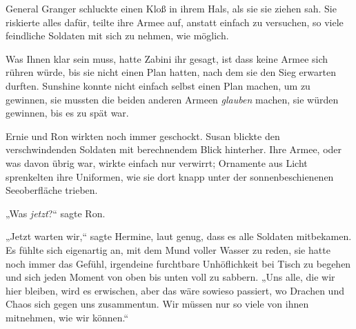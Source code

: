 General Granger schluckte einen Kloß in ihrem Hals, als sie sie ziehen sah. Sie riskierte alles dafür, teilte ihre Armee auf, anstatt einfach zu versuchen, so viele feindliche Soldaten mit sich zu nehmen, wie möglich.

Was Ihnen klar sein muss, hatte Zabini ihr gesagt, ist dass keine Armee sich rühren würde, bis sie nicht einen Plan hatten, nach dem sie den Sieg erwarten durften. Sunshine konnte nicht einfach selbst einen Plan machen, um zu gewinnen, sie mussten die beiden anderen Armeen \emph{glauben} machen, sie würden gewinnen, bis es zu spät war.

Ernie und Ron wirkten noch immer geschockt. Susan blickte den verschwindenden Soldaten mit berechnendem Blick hinterher. Ihre Armee, oder was davon übrig war, wirkte einfach nur verwirrt; Ornamente aus Licht sprenkelten ihre Uniformen, wie sie dort knapp unter der sonnenbeschienenen Seeoberfläche trieben.

„Was \emph{jetzt}?“ sagte Ron.

„Jetzt warten wir,“ sagte Hermine, laut genug, dass es alle Soldaten mitbekamen. Es fühlte sich eigenartig an, mit dem Mund voller Wasser zu reden, sie hatte noch immer das Gefühl, irgendeine furchtbare Unhöflichkeit bei Tisch zu begehen und sich jeden Moment von oben bis unten voll zu sabbern. „Uns alle, die wir hier bleiben, wird es erwischen, aber das wäre sowieso passiert, wo Drachen und Chaos sich gegen uns zusammentun. Wir müssen nur so viele von ihnen mitnehmen, wie wir können.“

